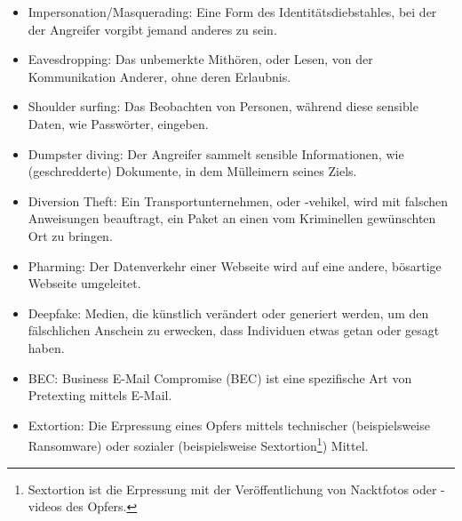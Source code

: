 \begin{itemize}
    \setlength\itemsep{-0.8em}
    \item Impersonation/Masquerading: Eine Form des Identitätsdiebstahles, bei der der Angreifer vorgibt jemand anderes zu sein.
    \item Eavesdropping: Das unbemerkte Mithören, oder Lesen, von der Kommunikation Anderer, ohne deren Erlaubnis.
    \item Shoulder surfing: Das Beobachten von Personen, während diese sensible Daten, wie Passwörter, eingeben.
    \item Dumpster diving: Der Angreifer sammelt sensible Informationen, wie (geschredderte) Dokumente, in dem Mülleimern seines Ziels.
    \item Diversion Theft: Ein Transportunternehmen, oder -vehikel, wird mit falschen Anweisungen beauftragt, ein Paket an einen vom Kriminellen gewünschten Ort zu bringen.
    \item Pharming: Der Datenverkehr einer Webseite wird auf eine andere, bösartige Webseite umgeleitet.
    \item Deepfake: Medien, die künstlich verändert oder generiert werden, um den fälschlichen Anschein zu erwecken, dass Individuen etwas getan oder gesagt haben.
    \item BEC: Business E-Mail Compromise (BEC) ist eine spezifische Art von Pretexting mittels E-Mail.
    \item Extortion: Die Erpressung eines Opfers mittels technischer (beispielsweise Ransomware) oder sozialer (beispielsweise Sextortion\footnote{Sextortion ist die Erpressung mit der Veröffentlichung von Nacktfotos oder -videos des Opfers.}) Mittel.
\end{itemize}

